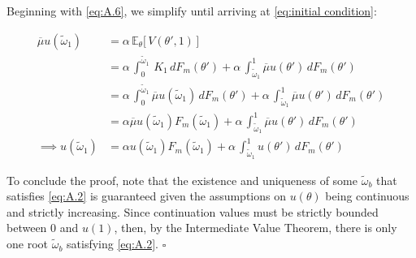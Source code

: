 Beginning with \ref{eq:A.6}, we simplify until arriving at \autoref{eq:initial condition}:

\begin{equation*} 
    \begin{split}
        \overline\mu u(\widetilde\omega_1) &= \alpha \, \mathbb{E}_\theta\Big[\,V(\theta',1)\,\Big]\\
        &= \alpha \,\int^{\widetilde\omega_1}_0\,K_1\,dF_m(\theta') + \alpha \,\int_{\widetilde\omega_1}^1 \overline\mu u(\theta')\,dF_m(\theta')\\
        &= \alpha \,\int^{\widetilde\omega_1}_0 \overline\mu u(\widetilde\omega_1)\,dF_m(\theta') + \alpha \,\int_{\widetilde\omega_1}^1 \overline\mu u(\theta')\,dF_m(\theta')\\
        &= \alpha \overline\mu u(\widetilde\omega_1)F_m(\widetilde\omega_1) + \alpha \,\int_{\widetilde\omega_1}^1 \overline\mu u(\theta')\,dF_m(\theta')\\
        \implies u(\widetilde\omega_1) &= \alpha u(\widetilde\omega_1)F_m(\widetilde\omega_1) + \alpha \,\int_{\widetilde\omega_1}^1 u(\theta')\,dF_m(\theta') 
    \end{split}
\end{equation*}  

To conclude the proof, note that the existence and uniqueness of some $\widetilde\omega_b$ that satisfies \ref{eq:A.2} is guaranteed given the assumptions on $u(\theta)$ being continuous and strictly increasing. Since continuation values must be strictly bounded between 0 and $u(1)$, then, by the Intermediate Value Theorem, there is only one root $\widetilde\omega_b$ satisfying \ref{eq:A.2}.  $\square$

